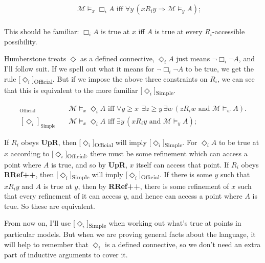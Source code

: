 \documentclass[
  11pt,
  letterpaper,
  DIV=11,
  numbers=noendperiod,
  twoside]{scrartcl}
\begin{document}
\begin{align*}
[\Box_i] \quad & \mathcal{M} \models_x \Box_i A \text{ iff } \forall y \, (x R_i y \Rightarrow \mathcal{M} \models_y A); \\
\end{align*}

This should be familiar: \(\Box_i A\) is true at \(x\) iff \(A\) is true
at every \(R_i\)-accessible possibility.

Humberstone treats \(\Diamond\) as a defined connective,
\(\Diamond_i A\) just means \(\neg \Box_i \neg A\), and I'll follow
suit. If we spell out what it means for \(\neg \Box_i \neg A\) to be
true, we get the rule {[}\(\Diamond_i\){]}\textsubscript{Official}. But
if we impose the above three constraints on \(R_i\), we can see that
this is equivalent to the more familiar
{[}\(\Diamond_i\){]}\textsubscript{Simple}.

\begin{align*}
[\Diamond_i]_{\text{Official}} \quad & \mathcal{M} \models_x \Diamond_i A \text{ iff } \forall y \geqslant x \;\, \exists z \geqslant y \, \exists w \, (z R_i w \text{ and } \mathcal{M} \models_w A). \\
[\Diamond_i]_{\text{Simple}} \quad & \mathcal{M} \models_x \Diamond_i A \text{ iff } \exists y \, (x R_i y \text{ and } \mathcal{M} \models_y A);
\end{align*}

If \(R_i\) obeys \textbf{UpR}, then
{[}\(\Diamond_i\){]}\textsubscript{Official} will imply
{[}\(\Diamond_i\){]}\textsubscript{Simple}. For \(\Diamond_i A\) to be
true at \(x\) according to {[}\(\Diamond_i\){]}\textsubscript{Official},
there must be some refinement which can access a point where \(A\) is
true, and so by \textbf{UpR}, \(x\) itself can access that point. If
\(R_i\) obeys \textbf{RRef++}, then
{[}\(\Diamond_i\){]}\textsubscript{Simple} will imply
{[}\(\Diamond_i\){]}\textsubscript{Official}. If there is some \(y\)
such that \(xR_iy\) and \(A\) is true at \(y\), then by \textbf{RRef++},
there is some refinement of \(x\) such that every refinement of it can
access \(y\), and hence can access a point where \(A\) is true. So these
are equivalent.

From now on, I'll use {[}\(\Diamond_i\){]}\textsubscript{Simple} when
working out what's true at points in particular models. But when we are
proving general facts about the language, it will help to remember that
\(\Diamond_i\) is a defined connective, so we don't need an extra part
of inductive arguments to cover it.
\end{document}
